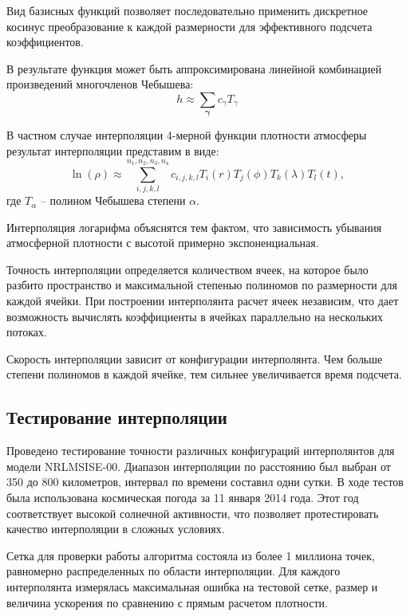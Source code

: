 Вид базисных функций позволяет последовательно
применить дискретное косинус преобразование к каждой размерности для эффективного подсчета
коэффициентов. 

В результате функция может быть аппроксимирована линейной комбинацией произведений
многочленов Чебышева:
\begin{equation*}
    h \approx \sum_{\mathbf{\gamma}} c_{\gamma} T_\gamma
\end{equation*}

В частном случае интерполяции 4-мерной функции плотности атмосферы
результат интерполяции представим в виде:
\begin{equation*}
    \ln(\rho) \approx \sum_{i,j,k,l}^{n_1, n_2, n_3, n_4} 
    c_{i,j,k,l} T_i(r) T_j(\phi) T_k (\lambda) T_l (t),
\end{equation*}
где $T_\alpha$ -- полином Чебышева степени $\alpha$.

Интерполяция логарифма объяснятся тем фактом, что зависимость убывания
атмосферной плотности с высотой примерно экспоненциальная.

Точность интерполяции определяется количеством ячеек, на которое было разбито пространство
и максимальной степенью полиномов по размерности для каждой ячейки. При построении
интерполянта расчет ячеек независим, что дает возможность вычислять коэффициенты в ячейках
параллельно на нескольких потоках.

Скорость интерполяции зависит от конфигурации интерполянта. Чем больше степени полиномов в
каждой ячейке, тем сильнее увеличивается время подсчета.

\subsection{Тестирование интерполяции}

Проведено тестирование точности различных конфигураций интерполянтов для модели NRLMSISE-00.
Диапазон интерполяции по расстоянию был выбран от 350 до 800 километров, интервал по времени
составил одни сутки. В ходе тестов была использована космическая погода за 11 января 2014 года.
Этот год соответствует высокой солнечной активности, что позволяет протестировать качество
интерполяции в сложных условиях.

Сетка для проверки работы алгоритма состояла из более 1 миллиона точек, равномерно
распределенных по области интерполяции. Для каждого интерполянта измерялась максимальная
ошибка на тестовой сетке, размер и величина ускорения по сравнению с прямым расчетом плотности.

